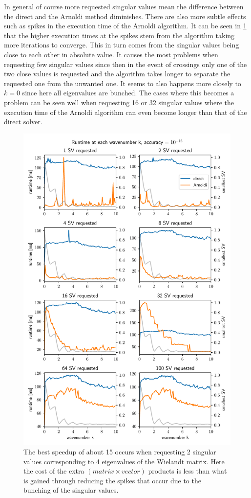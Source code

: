\documentclass[a4paper, oneside]{discothesis}
\begin{document}
In general of course more requested singular values mean the difference between the direct and the Arnoldi method diminishes.
There are also more subtle effects such as spikes in the execution time of the Arnoldi algorithm.
It can be seen in \ref{fig:arnoldi_time_1e-16} that the higher execution times at the spikes stem from the algorithm taking more iterations to converge.
This in turn comes from the singular values being close to each other in absolute value.
It causes the most problems when requesting few singular values since then in the event of crossings only one of the two close values is requested and the algorithm takes longer to separate the requested one from the unwanted one.
It seems to also happens more closely to $k=0$ since here all eigenvalues are bunched.
The cases where this becomes a problem can be seen well when requesting 16 or 32 singular values where the execution time of the Arnoldi algorithm can even become longer than that of the direct solver.
\begin{figure} [H]
	\centering
	\includegraphics[width=\columnwidth]{figures/arnoldi_time_1e-16.pdf}
	\caption{
		The best speedup of about 15 occurs when requesting 2 singular values corresponding to 4 eigenvalues of the Wielandt matrix. 
		Here the cost of the extra $(matrix\times vector)$ products is less than what is gained through reducing the spikes that occur due to the bunching of the singular values.
	}
	\label{fig:arnoldi_time_1e-16}
\end{figure}
\end{document}
